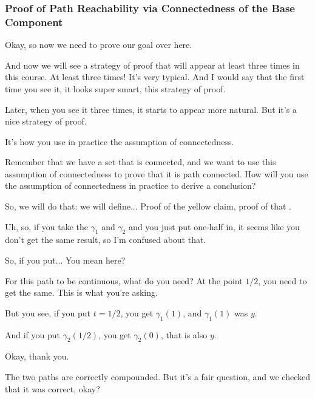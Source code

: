 \begin{proofWrapper}
\subsubsection{Proof of Path Reachability via Connectedness of the Base Component}

\begin{speech}[01:00:18 - 01:01:53]
Okay, so now we need to prove our goal over here.

And now we will see a strategy of proof that will appear at least three times in this course. At least three times! It's very typical. And I would say that the first time you see it, it looks super smart, this strategy of proof.

Later, when you see it three times, it starts to appear more natural. But it's a nice strategy of proof.

It's how you use in practice the assumption of connectedness.

Remember that we have a set that is connected, and we want to use this assumption of connectedness to prove that it is path connected. How will you use the assumption of connectedness in practice to derive a conclusion?

So, we will do that: we will define... Proof of the yellow claim, proof of that .
\end{speech}

\begin{student}
Uh, so, if you take the $\gamma_1$ and $\gamma_2$ and you just put one-half in, it seems like you don't get the same result, so I'm confused about that.
\end{student}

\begin{speech}[01:02:05 - 01:02:44]
So, if you put... You mean here?

For this path to be continuous, what do you need? At the point $1/2$, you need to get the same. This is what you're asking.

But you see, if you put $t = 1/2$, you get $\gamma_1(1)$, and $\gamma_1(1)$ was $y$.

And if you put $\gamma_2(1/2)$, you get $\gamma_2(0)$, that is also $y$.
\end{speech}

\begin{student}
Okay, thank you.
\end{student}

\begin{speech}[01:02:45 - 01:03:02]
The two paths are correctly compounded. But it's a fair question, and we checked that it was correct, okay?
\end{speech}


\end{proofWrapper}
